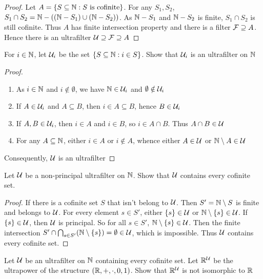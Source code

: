 \documentclass[11pt]{article}
\begin{document}
\begin{proof}
Let \(A=\{S\subseteq\mathbb{N}:S\text{ is cofinite}\}\). For any \(S_1,S_2\), \(S_1\cap S_2=\mathbb{N}-((\mathbb{N}-S_1)\cup(\mathbb{N}-S_2))\). As \(\mathbb{N}-S_1\)
and \(\mathbb{N}-S_2\) is finite, \(S_1\cap S_2\) is still cofinite. Thus \(A\) has finite intersection property
and there is a filter \(\mathcal{F}\supseteq A\). Hence there is an ultrafilter \(\mathcal{U}\supseteq\mathcal{F}\supseteq A\)
\end{proof}


\begin{exercise}
For \(i\in\mathbb{N}\), let \(\mathcal{U}_i\) be the set \(\{S\subseteq\mathbb{N}:i\in S\}\). Show that \(\mathcal{U}_i\) is an ultrafilter on \(\mathbb{N}\)
\end{exercise}

\begin{proof}
\begin{enumerate}
\item As \(i\in\mathbb{N}\) and \(i\notin\emptyset\), we have \(\mathbb{N}\in\mathcal{U}_i\) and \(\emptyset\notin\mathcal{U}_i\)
\item If \(A\in\mathcal{U}_i\) and \(A\subseteq B\), then \(i\in A\subseteq B\), hence \(B\in\mathcal{U}_i\)
\item If \(A,B\in\mathcal{U}_i\), then \(i\in A\) and \(i\in B\), so \(i\in A\cap B\). Thus \(A\cap B\in\mathcal{U}\)
\item For any \(A\subseteq\mathbb{N}\), either \(i\in A\) or \(i\notin A\), whence either \(A\in\mathcal{U}\) or \(\mathbb{N}\setminus A\in\mathcal{U}\)
\end{enumerate}


Consequently, \(\mathcal{U}\) is an ultrafilter
\end{proof}


\begin{exercise}
Let \(\mathcal{U}\) be a non-principal ultrafilter on \(\mathbb{N}\). Show that \(\mathcal{U}\) contains every cofinite set.
\end{exercise}

\begin{proof}
If there is a cofinite set \(S\) that isn't belong to \(\mathcal{U}\). Then \(S'=\mathbb{N}\setminus S\) is finite and belongs
to \(\mathcal{U}\). For every element \(s\in S'\), either \(\{s\}\in\mathcal{U}\) or \(\mathbb{N}\setminus\{s\}\in\mathcal{U}\). If \(\{s\}\in\mathcal{U}\), then \(\mathcal{U}\)
is principal. So for all \(s\in S'\), \(\mathbb{N}\setminus\{s\}\in\mathcal{U}\). Then the finite intersection
\(S'\cap\bigcap_{s\in S'}(\mathbb{N}\setminus\{s\})=\emptyset\in\mathcal{U}\), which is impossible. Thus \(\mathcal{U}\) contains every cofinite set.
\end{proof}

\begin{exercise}[]
Let \(\mathcal{U}\) be an ultrafilter on \(\mathbb{N}\) containing every cofinite set. Let \(\mathbb{R}^{\mathcal{U}}\) be the ultrapower
of the structure \((\mathbb{R},+,\cdot,0,1)\). Show that \(\mathbb{R}^{\mathcal{U}}\) is not isomorphic to \(\mathbb{R}\)
\end{exercise}
\end{document}
